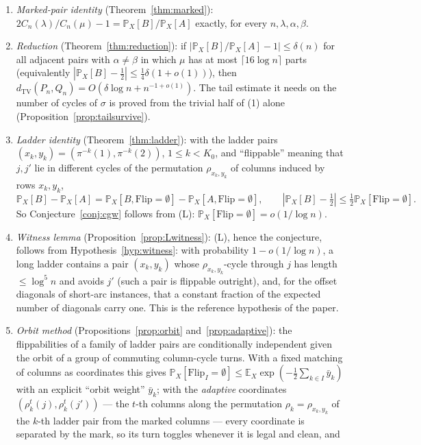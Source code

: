 \documentclass[11pt]{article}
\theoremstyle{definition}
\newcommand{\dtv}{d_{\mathrm{TV}}}
\newcommand{\E}{\mathbb{E}}
\renewcommand{\Pr}{\mathbb{P}}
\newcommand{\PP}{P}
\newcommand{\QQ}{Q}
\newcommand{\CC}{C}
\begin{document}
\begin{enumerate}[leftmargin=2em]
\item[(1)] \emph{Marked-pair identity} (Theorem~\ref{thm:marked}):
$2\CC_n(\lambda)/\CC_n(\mu)-1=\Pr_X[B]/\Pr_X[A]$ exactly, for every $n,\lambda,\alpha,\beta$.
\item[(2)] \emph{Reduction} (Theorem~\ref{thm:reduction}): if
$|\Pr_X[B]/\Pr_X[A]-1|\le\delta(n)$ for all adjacent pairs with $\alpha\ne\beta$ in which
$\mu$ has at most $\lceil16\log n\rceil$ parts
(equivalently $|\Pr_X[B]-\tfrac12|\le\tfrac14\delta(1+o(1))$), then
$\dtv(\PP_n,\QQ_n)=O(\delta\log n+n^{-1+o(1)})$.  The tail estimate it needs on the number
of cycles of $\sigma$ is proved from the trivial half of (1) alone
(Proposition~\ref{prop:tailsurvive}).
\item[(3)] \emph{Ladder identity} (Theorem~\ref{thm:ladder}): with the ladder pairs
$(x_k,y_k)=(\pi^{-k}(1),\pi^{-k}(2))$, $1\le k<K_0$, and ``flippable'' meaning that $j,j'$
lie in different cycles of the permutation $\rho_{x_k,y_k}$ of columns induced by rows $x_k,y_k$,
\[
\Pr_X[B]-\Pr_X[A]=\Pr_X[B,\mathrm{Flip}=\emptyset]-\Pr_X[A,\mathrm{Flip}=\emptyset],
\qquad |\Pr_X[B]-\tfrac12|\le\tfrac12\Pr_X[\mathrm{Flip}=\emptyset].
\]
So Conjecture~\ref{conj:cgw} follows from (L): $\Pr_X[\mathrm{Flip}=\emptyset]=o(1/\log n)$.
\item[(4)] \emph{Witness lemma} (Proposition~\ref{prop:Lwitness}): (L), hence the
conjecture, follows from Hypothesis~\ref{hyp:witness}: with probability $1-o(1/\log n)$,
a long ladder contains a pair $(x_k,y_k)$ whose $\rho_{x_k,y_k}$-cycle through $j$ has
length $\le\log^5n$ and avoids $j'$ (such a pair is flippable outright), and, for the offset
diagonals of short-arc instances, that a constant fraction of the expected number of
diagonals carry one.  This is the reference hypothesis of the paper.
\item[(5)] \emph{Orbit method} (Propositions~\ref{prop:orbit} and~\ref{prop:adaptive}):
the flippabilities of a family of ladder pairs are conditionally independent given the
orbit of a group of commuting column-cycle turns.  With a fixed matching of columns as
coordinates this gives $\Pr_X[\mathrm{Flip}_I=\emptyset]\le\E_X\exp(-\tfrac12\sum_{k\in I}\bar y_k)$
with an explicit ``orbit weight'' $\bar y_k$; with the \emph{adaptive} coordinates
$(\rho_k^t(j),\rho_k^t(j'))$ --- the $t$-th columns along the permutation $\rho_k=\rho_{x_k,y_k}$
of the $k$-th ladder pair from the marked columns --- every coordinate is separated by the
mark, so its turn toggles whenever it is legal and clean, and

\end{enumerate}
\end{document}
